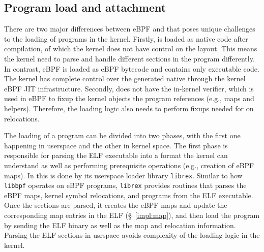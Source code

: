 \subsection{Program load and attachment}
\label{impl:load}
There are two major differences between eBPF and \projname{} that poses unique
    challenges to the loading of \projname{} programs in the kernel.
Firstly, \projname{} is loaded as native code after compilation, of which the
    kernel does not have control on the layout.
This means the kernel need to parse and handle different sections in the
    program differently.
In contrast, eBPF is loaded as eBPF bytecode and contains only executable code.
The kernel has complete control over the generated native through the kernel
    eBPF JIT infrastructure.
Secondly, \projname{} does not have the in-kernel verifier, which is used in
    eBPF to fixup the kernel objects the program references (e.g., maps and
    helpers).
Therefore, the loading logic also needs to perform fixups needed for
    \projname{} on relocations.

The loading of a \projname{} program can be divided into two phases, with the
    first one happening in userspace and the other in kernel space.
The first phase is responsible for parsing the ELF executable into a format the
    kernel can understand as well as performing prerequisite operations (e.g.,
    creation of eBPF maps).
In \projname{} this is done by its userspace loader library \texttt{librex}.
Similar to how \texttt{libbpf} operates on eBPF programs, \texttt{librex}
    provides routines that parses the eBPF maps, kernel symbol relocations,
    and programs from the \projname{} ELF executable.
Once the sections are parsed, it creates the eBPF maps and update the
    corresponding map entries in the ELF (\S~\ref{impl:map}), and then load
    the program by sending the ELF binary as well as the map and relocation
    information.
Parsing the ELF sections in usrspace avoids complexity of the loading logic in
    the kernel.


